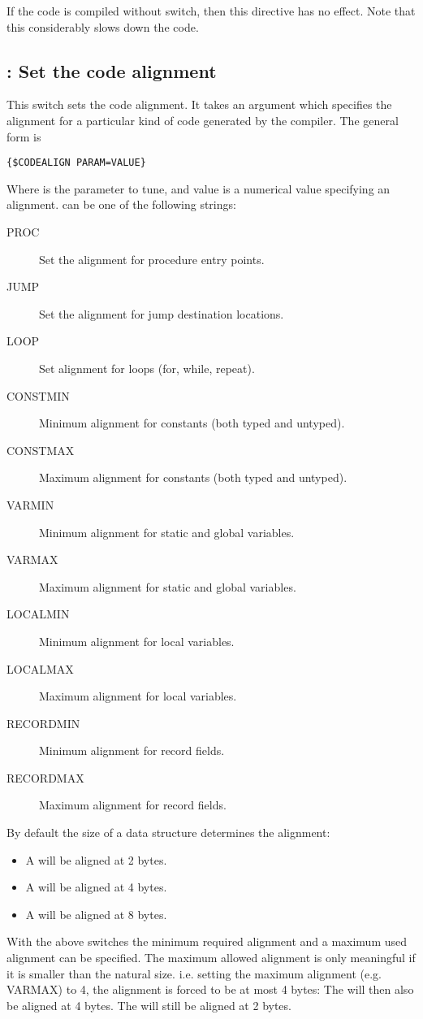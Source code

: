 If the code is compiled without  switch, then this directive has no
effect. Note that this considerably slows down the code.

\subsection{ : Set the code alignment}
This switch sets the code alignment. It takes an argument which specifies
the alignment for a particular kind of code generated by the compiler. 
The general form is
\begin{verbatim}
{$CODEALIGN PARAM=VALUE}
\end{verbatim}
Where  is the parameter to tune, and  value is a
numerical value specifying an alignment.  can be one of the
following strings:
\begin{description}
\item[PROC] Set the alignment for procedure entry points.
\item[JUMP] Set the alignment for jump destination locations.
\item[LOOP] Set alignment for loops (for, while, repeat).
\item[CONSTMIN] Minimum alignment for constants (both typed and untyped).
\item[CONSTMAX] Maximum alignment for constants (both typed and untyped).
\item[VARMIN] Minimum alignment for static and global variables.
\item[VARMAX] Maximum alignment for static and global variables.
\item[LOCALMIN] Minimum alignment for local variables.
\item[LOCALMAX] Maximum alignment for local variables.
\item[RECORDMIN] Minimum alignment for record fields.
\item[RECORDMAX] Maximum alignment for record fields.
\end{description}
By default the size of a data structure determines the alignment:
\begin{itemize}
\item A  will be aligned at 2 bytes.
\item A  will be aligned at 4 bytes.
\item A  will be aligned at 8 bytes. 
\end{itemize}
With the above switches the minimum required alignment and a maximum 
used alignment can be specified. The maximum allowed alignment is only
meaningful if it is smaller than the natural size. i.e. setting the 
maximum alignment (e.g. VARMAX) to 4, the alignment is forced to
be at most 4 bytes: The  will then also be aligned at 
4 bytes. The  will still be aligned at 2 bytes.

